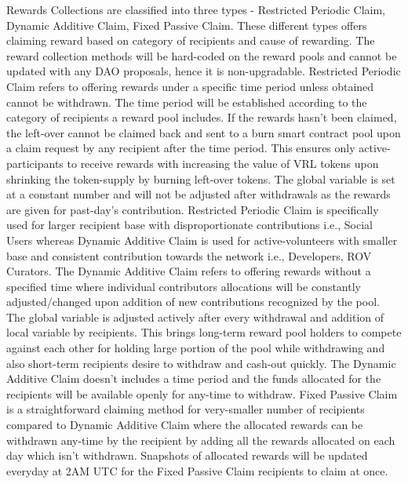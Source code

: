 \documentclass[letterpaper,11pt]{article}
\begin{document}
Rewards Collections are classified into three types - Restricted Periodic Claim,  Dynamic Additive Claim, Fixed Passive Claim. These different types offers claiming reward based on category of recipients and cause of rewarding. The reward collection methods will be hard-coded on the reward pools and cannot be updated with any DAO proposals, hence it is non-upgradable. Restricted Periodic Claim refers to offering rewards under a specific time period unless obtained cannot be withdrawn. The time period will be established according to the category of recipients a reward pool includes. If the rewards hasn't been claimed, the left-over cannot be claimed back and sent to a burn smart contract pool upon a claim request by any recipient after the time period. This ensures only active-participants to receive rewards with increasing the value of VRL tokens upon shrinking the token-supply by burning left-over tokens. The global variable is set at a constant number and will not be adjusted after withdrawals as the rewards are given for past-day's contribution. Restricted Periodic Claim is specifically used for larger recipient base with disproportionate contributions i.e., Social Users whereas Dynamic Additive Claim is used for active-volunteers with smaller base and consistent contribution towards the network i.e., Developers, ROV Curators. The Dynamic Additive Claim refers to offering rewards without a specified time where individual contributors allocations will be constantly adjusted/changed upon addition of new contributions recognized by the pool. The global variable is adjusted actively after every withdrawal and addition of local variable by recipients. This brings long-term reward pool holders to compete against each other for holding large portion of the pool while withdrawing and also short-term recipients desire to withdraw and cash-out quickly. The Dynamic Additive Claim doesn't includes a time period and the funds allocated for the recipients will be available openly for any-time to withdraw. Fixed Passive Claim is a straightforward claiming method for very-smaller number of recipients compared to Dynamic Additive Claim where the allocated rewards can be withdrawn any-time by the recipient by adding all the rewards allocated on each day which isn't withdrawn. Snapshots of allocated rewards will be updated everyday at 2AM UTC for the Fixed Passive Claim recipients to claim at once.\\
\end{document}
